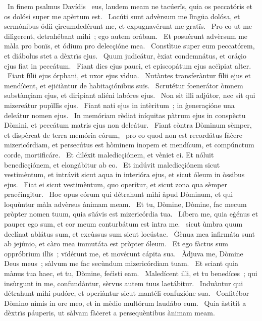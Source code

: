 {~In finem psalmus Davídis}
{%
~eus, laudem meam ne tacúerïs, quia os peccatóris et os dolósi super me apèrtum est.
~Locúti sunt advèrsum me lìngüa dolósa, et sermónibus ódii çircumdedérunt me, et expugnavérunt me gratïs.
~Pro eo ut me dilìgerent, detrahébant mìhi~; ego autem orábam.
~Et posuérunt advèrsum me màla pro bonïs, et ódium pro delecçióne mea.
~Constìtue super eum peccatórem, et diábolus stet a dèxtrïs ejus.
~Quum judicátur, èxiat condemnátus, et oráçio ejus fiat in peccátum.
~Fiant dies ejus pauci, et episcopátum ejus acċìpiat alter.
~Fiant fílii ejus órphani, et uxor ejus vìdua.
~Nutàntes transferàntur fílii ejus et mendíċent, et ejiċiàntur de habitaçiónibus suïs.
~Scrutétur foenerátor òmnem substànçiam ejus, et dirìpiant aliéni labóres ejus.
~Non sit illi adjútor, nec sit qui mizereátur pupìllïs ejus.
~Fiant nati ejus in intèritum~; in ġeneraçióne una deleátur nomen ejus.
~In memóriam rèdiat iníquitas pàtrum ejus in conspèctu Dòmini, et peccátum matris ejus non deleátur.
~Fiant còntra Dòminum sèmper, et dispèreat de terra memória eórum,
~pro eo quod non est recordátus fàċere mizericórdiam, et persecútus est hòminem ìnopem et mendícum, et compúnctum corde, mortificáre.
~Et diléxit maledicçiónem, et vèniet ei. Et nóluit benedicçiónem, et elongábitur ab eo.
~Et indúvit maledicçiónem sicut vestimèntum, et intrávit sicut aqua in interióra ejus, et sicut óleum in òssibus ejus.
~Fiat ei sicut vestimèntum, quo operítur, et sicut zona qua sèmper praeċìngitur.
~Hoc opus eórum qui détrahunt mìhi àpud Dòminum, et qui loquùntur màla advèrsus ànimam meam.
~Et tu, Dòmine, Dòmine, fac mecum pròpter nomen tuum, quia süávis est mizericórdia tua.
~Líbera me, quia eġénus et pauper ego sum, et cor meum conturbátum est intra me.
~sicut ùmbra quum declínat ablátus sum, et excùssus sum sicut locústae.
~Ġènua mea infirmáta sunt ab jejúnio, et càro mea immutáta est pròpter óleum.
~Et ego fàctus sum oppróbrium illïs~; vïdérunt me, et movérunt cápita sua.
~Àdjuva me, Dòmine Deus meus~; sàlvum me fac secùndum mizericórdiam tuam.
~Et sciant quia mànus tua haec, et tu, Dòmine, feċìsti eam.
~Maledícent illi, et tu benedíces~; qui insùrgunt in me, confundàntur, sèrvus autem tuus laetábitur.
~Induàntur qui détrahunt mìhi pudóre, et operiàntur sicut mantéli confuzióne sua.
~Confitébor Dòmino nìmis in ore meo, et in mèdio multórum laudábo eum.
~Quia àstitit a dèxtrïs páuperis, ut sàlvam fàċeret a persequèntibus ànimam meam.
}
